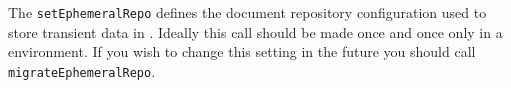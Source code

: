 The \verb+setEphemeralRepo+ defines the document repository configuration used to store transient data
in \Rapture. Ideally this call should be made once and once only in a \Rapture environment. If you wish to
change this setting in the future you should call \verb+migrateEphemeralRepo+.
